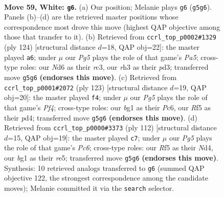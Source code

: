 \documentclass[11pt]{article}
\begin{document}
\clearpage

\begin{figure}[p]\centering
\begin{subfigure}{0.46\textwidth}\centering
\resizebox{\linewidth}{!}{%
\newchessgame
\chessboard[
  setfen={7k/8/3Nn3/5RP1/P7/7r/8/4K1b1 w - - 8 59},
  showmover=false,
  pgfstyle=straightmove, color=movearrow, markmove={g5-g6}
]}
\caption{}
\end{subfigure}\hfill
\begin{subfigure}{0.46\textwidth}\centering
\resizebox{\linewidth}{!}{%
\newchessgame
\chessboard[
  setfen={6k1/8/8/P7/R7/1nrp1N2/8/6K1 w - - 2 63},
  showmover=false,
  pgfstyle=straightmove, color=movearrow, markmove={a5-a6}
]}
\caption{}
\end{subfigure}
\\[4pt]
\begin{subfigure}{0.46\textwidth}\centering
\resizebox{\linewidth}{!}{%
\newchessgame
\chessboard[
  setfen={8/7k/r1p5/5p2/1P1P2nN/8/8/4R1K1 b - - 1 62},
  showmover=false,
  pgfstyle=straightmove, color=movearrow, markmove={f5-f4}
]}
\caption{}
\end{subfigure}\hfill
\begin{subfigure}{0.46\textwidth}\centering
\resizebox{\linewidth}{!}{%
\newchessgame
\chessboard[
  setfen={2r3k1/3R4/2P4p/4r3/3N4/8/8/6K1 w - - 0 57},
  showmover=false,
  pgfstyle=straightmove, color=movearrow, markmove={c6-c7}
]}
\caption{}
\end{subfigure}
\caption{\textbf{Move 59, White: \texttt{g6}.} (a) Our position; Melanie plays \texttt{g6} (\texttt{g5g6}). Panels (b)--(d) are the retrieved master positions whose correspondence most drove this move (highest QAP objective among those that transfer to it). (b) Retrieved from \texttt{ccrl\_top\_p0002\#1329} (ply 124) [structural distance $d$=18, QAP obj=22]: the master played \texttt{a6}; under $\mu$ our \emph{Pg5} plays the role of that game's \emph{Pa5}; cross-type roles: our \emph{N}d6 as their \emph{r}c3, our \emph{r}h3 as their \emph{p}d3; transferred move \texttt{g5g6} \textbf{(endorses this move)}. (c) Retrieved from \texttt{ccrl\_top\_p0001\#2072} (ply 123) [structural distance $d$=19, QAP obj=20]: the master played \texttt{f4}; under $\mu$ our \emph{Pg5} plays the role of that game's \emph{Pf4}; cross-type roles: our \emph{b}g1 as their \emph{P}c6, our \emph{R}f5 as their \emph{p}d4; transferred move \texttt{g5g6} \textbf{(endorses this move)}. (d) Retrieved from \texttt{ccrl\_top\_p0000\#3373} (ply 112) [structural distance $d$=15, QAP obj=19]: the master played \texttt{c7}; under $\mu$ our \emph{Pg5} plays the role of that game's \emph{Pc6}; cross-type roles: our \emph{R}f5 as their \emph{N}d4, our \emph{b}g1 as their \emph{r}e5; transferred move \texttt{g5g6} \textbf{(endorses this move)}. Synthesis: 10 retrieved analogs transferred to \texttt{g6} (summed QAP objective 122, the strongest correspondence among the candidate moves); Melanie committed it via the \texttt{search} selector.}
\label{fig:thought-m116}
\end{figure}
\end{document}
